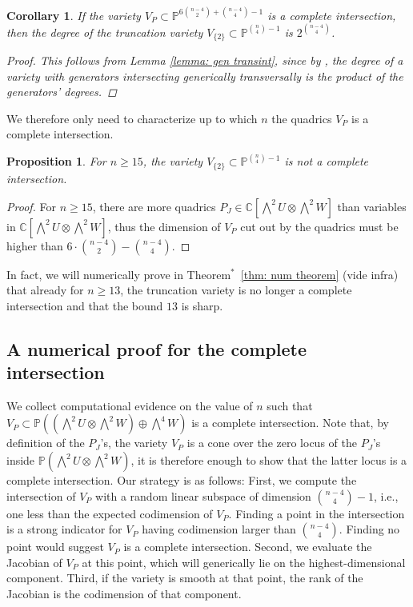 \documentclass[11pt,reqno]{amsart}
\newtheorem{proposition}[theorem]{Proposition}
\newtheorem{corollary}[theorem]{Corollary}
\theoremstyle{definition}
\numberwithin{theorem}{section}
\numberwithin{equation}{section}
\begin{document}
\begin{corollary}\label{cor: degree truncation}
    If the variety $V_P \subset \mathbb P^{6{n-4 \choose 2} + {n-4 \choose 4}-1}$ is a complete intersection, then the degree of the truncation variety $V_{\{2\}} \subset \mathbb P^{{n \choose 4}-1}$ is $2^{{n-4} \choose 4}$.

    \begin{proof} This follows from Lemma \ref{lemma: gen transint}, since by
        \cite[Theorem 18.3]{harris1992algebraic}, the degree of a variety with generators intersecting generically transversally is the product of the generators' degrees.
    \end{proof}
\end{corollary}


\noindent We therefore only need to characterize up to which $n$ the quadrics $V_P$ is a complete intersection. 

\begin{proposition}\label{prop:not CI}
For $n\geq 15$, the variety $V_{\{2\}} \subset \mathbb P^{{n \choose 4}-1}$ is not a complete intersection.
\end{proposition}
\begin{proof}
For $n \geq 15$, there are more quadrics $P_J \in \mathbb C[\bigwedge^2 U \otimes \bigwedge^2 W]$ than variables in $\mathbb C[\bigwedge^2 U \otimes \bigwedge^2 W]$, thus the dimension of $V_P$ cut out by the quadrics must be higher than $6 \cdot {{n-4} \choose 2} - {{n-4} \choose 4}$. 
\end{proof}
\noindent In fact, we will numerically prove in Theorem$^*$~\ref{thm: num theorem} (vide infra) that already for $n \geq 13$, the truncation variety is no longer a complete intersection and that the bound $13$ is sharp.

\subsection{A numerical proof for the complete intersection}\label{subsec:numproof}


We collect computational evidence on the value of $n$ such that $V_P \subset \mathbb P(( \bigwedge^2U \otimes \bigwedge^2 W ) \oplus \bigwedge^4W )$ is a complete intersection. Note that, by definition of the $P_J$'s, the variety $V_P$ is a cone over the zero locus of the $P_J$'s inside $\mathbb P(\bigwedge^2U \otimes \bigwedge^2 W)$, it is therefore enough to show that the latter locus is a complete intersection. Our strategy is as follows: First, we compute the intersection of $V_P$ with a random linear subspace of dimension ${{n-4} \choose 4}-1$, i.e., one less than the expected codimension of $V_P$. Finding a point in the intersection is a strong indicator for $V_P$ having codimension larger than ${{n-4} \choose 4}$. Finding no point would suggest $V_P$ is a complete intersection.
  Second, we evaluate the Jacobian of $V_P$ at this point, which will generically lie on the highest-dimensional component. Third, if the variety is smooth at that point, the rank of the Jacobian is the codimension of that component.
\end{document}
